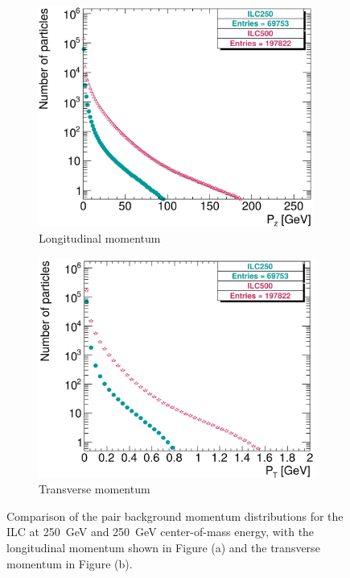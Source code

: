  \begin{figure}
 \centering
  \begin{subfigure}[b]{0.49\textwidth}
   \centering
    \includegraphics[width=0.99\textwidth]{Figures/Pairs/250_500_pairs_comparison_Pz.png}
   \caption{Longitudinal momentum}
   \end{subfigure}
   \hfill
    \begin{subfigure}[b]{0.49\textwidth}
   \centering
    \includegraphics[width=\textwidth]{Figures/Pairs/250_500_pairs_comparison_PT.png}
   \caption{Transverse momentum}
   \end{subfigure}
   \caption[Pair background momentum distributions]{Comparison of the pair background momentum distributions for the ILC at \SI[detect-all]{250}{\GeV} and \SI[detect-all]{250}{\GeV} center-of-mass energy, with the longitudinal momentum shown in Figure (a) and the transverse momentum in Figure (b).}
   \label{fig:PairBkg:Momentum}
 \end{figure}
